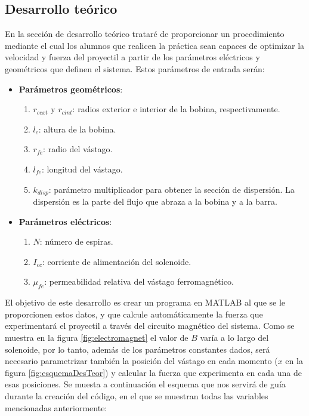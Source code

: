 \subsection{Desarrollo teórico}
\label{subsec:desarrolloteorico}
En la sección de desarrollo teórico trataré de proporcionar un procedimiento mediante el cual los alumnos que realicen la práctica sean capaces de optimizar la velocidad y fuerza del proyectil a partir de los parámetros eléctricos y geométricos que definen el sistema. Estos parámetros de entrada serán:
\begin{itemize}
    \item \textbf{Parámetros geométricos}:
    \begin{enumerate}[label=\alph*., leftmargin=*, itemindent=1em]
        \item \(r_{cext}\) y \(r_{cint} \): radios exterior e interior de la bobina, respectivamente.
        \item \(l_c\): altura de la bobina.
        \item \(r_{fe}\): radio del vástago.
        \item \(l_{fe}\): longitud del vástago.
        \item \(k_{disp}\): parámetro multiplicador para obtener la sección de dispersión. La dispersión es la parte del flujo que abraza a la bobina y a la barra.
    \end{enumerate}
    \item \textbf{Parámetros eléctricos}:
    \begin{enumerate}[label=\alph*., leftmargin=*, itemindent=1em]
        \item \(N\): número de espiras.
        \item \(I_{cc}\): corriente de alimentación del solenoide.
        \item \(\mu_{fe}\): permeabilidad relativa del vástago ferromagnético.
    \end{enumerate}
\end{itemize}

El objetivo de este desarrollo es crear un programa en MATLAB al que se le proporcionen estos datos, y que calcule automáticamente la fuerza que experimentará el proyectil a través del circuito magnético del sistema. Como se muestra en la figura \ref{fig:electromagnet} el valor de \(B\) varía a lo largo del solenoide, por lo tanto, además de los parámetros constantes dados, será necesario parametrizar también la posición del vástago en cada momento (\(x\) en la figura \ref{fig:esquemaDesTeor}) y calcular la fuerza que experimenta en cada una de esas posiciones. Se muesta a continuación el esquema que nos servirá de guía durante la creación del código, en el que se muestran todas las variables mencionadas anteriormente:

